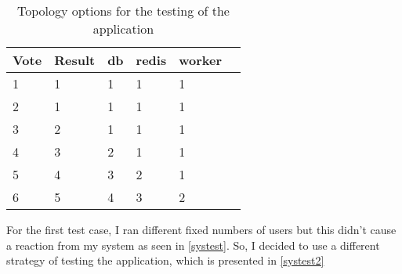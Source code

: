 \begin{table}[H]
\centering
\begin{tabular}{|l|l|l|l|l|l|}
\hline
 Vote & Result & db & redis & worker  \\ \hline
1 & 1 & 1 & 1 & 1  \\ \hline
2 & 1 & 1 & 1 & 1  \\ \hline
3 & 2 & 1 & 1 & 1 \\ \hline
4 & 3 & 2 & 1 & 1  \\ \hline
5 & 4 & 3 & 2 & 1  \\ \hline
6 & 5 & 4 & 3 & 2  \\ \hline
\end{tabular}%
\caption{Topology options for the testing of the application}
\label{tops}
\end{table}

For the first test case, I ran different fixed numbers of users but this didn't cause a reaction from my system as seen in \autoref{systest}. So, I decided to use a different strategy of testing the application, which is presented in \autoref{systest2}   
\begin{table}[H]
\caption{Test case 1 run on the application.}
\label{systest}
\end{table}

